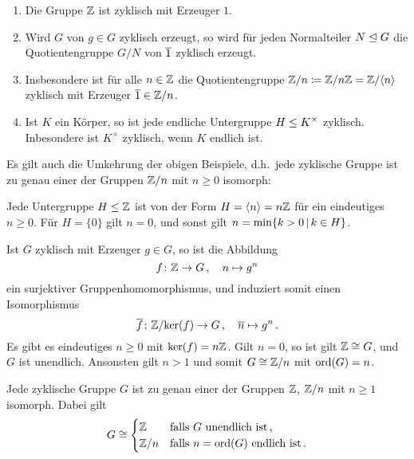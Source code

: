 \begin{example}
  \begin{enumerate}
    \item
      Die Gruppe $\mathbb{Z}$ ist zyklisch mit Erzeuger $1$.
    \item
      Wird $G$ von $g \in G$ zyklisch erzeugt, so wird für jeden Normalteiler $N \mathrel{\trianglelefteq} G$ die Quotientengruppe $G/N$ von $\overline{1}$ zyklisch erzeugt.
    \item
      Insbesondere ist für alle $n \in \mathbb{Z}$ die Quotientengruppe $\mathbb{Z}/n \coloneqq \mathbb{Z}/n\mathbb{Z} = \mathbb{Z}/\langle n\rangle$ zyklisch mit Erzeuger $\overline{1} \in \mathbb{Z}/n$.
    \item
      Ist $K$ ein Körper, so ist jede endliche Untergruppe $H \mathrel{\leq} K^\times$ zyklisch.
      Inbesondere ist $K^\times$ zyklisch, wenn $K$ endlich ist.
  \end{enumerate}
\end{example}

Es gilt auch die Umkehrung der obigen Beispiele, d.h.\ jede zyklische Gruppe ist zu genau einer der Gruppen $\mathbb{Z}/n$ mit $n \geq 0$ isomorph:

\begin{lemma}
\label{lemma: subgroups of Z}
  Jede Untergruppe $H \mathrel{\leq} \mathbb{Z}$ ist von der Form $H = \langle n\rangle = n\mathbb{Z}$ für ein eindeutiges $n \geq 0$.
  Für $H = \{0\}$ gilt $n = 0$, und sonst gilt $n = \min \{k > 0 \suchthat k \in H\}$.
\end{lemma}

Ist $G$ zyklisch mit Erzeuger $g \in G$, so ist die Abbildung
\[
          f
  \colon  \mathbb{Z}
  \to     G \,,
  \quad   n
  \mapsto g^n
\]
ein surjektiver Gruppenhomomorphismus, und induziert somit einen Isomorphismus
\[
          \overline{f}
  \colon  \mathbb{Z}/{\ker(f)}
  \to     G \,,
  \quad   \overline{n}
  \mapsto g^n \,.
\]
Es gibt es eindeutiges $n \geq 0$ mit $\ker(f) = n\mathbb{Z}$.
Gilt $n = 0$, so ist gilt $\mathbb{Z} \cong G$, und $G$ ist unendlich.
Ansonsten gilt $n > 1$ und somit $G \cong \mathbb{Z}/n$ mit $\operatorname{ord}(G) = n$.

\begin{corollary}
  Jede zyklische Gruppe $G$ ist zu genau einer der Gruppen $\mathbb{Z}$, $\mathbb{Z}/n$ mit $n \geq 1$ isomorph.
  Dabei gilt
  \[
          G
    \cong \begin{cases}
              \mathbb{Z}
            & \text{falls $G$ unendlich ist} \,,
          \\
              \mathbb{Z}/n
            & \text{falls $n = \operatorname{ord}(G)$ endlich ist} \,.
          \end{cases}
  \]
\end{corollary}

